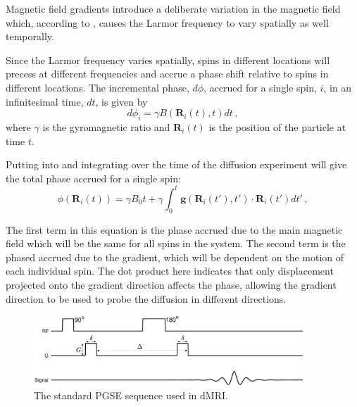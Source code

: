 Magnetic field gradients introduce a deliberate variation in the magnetic field which, according to , causes the Larmor frequency to vary spatially as well temporally.

Since the Larmor frequency varies spatially, spins in different locations will precess at different frequencies and accrue a phase shift relative to spins in different locations. 
The incremental phase, $d\phi$, accrued for a single spin, $i$, in an infinitesimal time, $dt$, %
is given by
\begin{equation}
  d\phi_i = \gamma B(\mathbf{R}_i(t), t) dt\,,
  \label{eq:dphi}
\end{equation}
where $\gamma$ is the gyromagnetic ratio and  $\mathbf{R}_i(t)$ is the position of the particle at time $t$. %

Putting  into  and integrating over the time of the diffusion experiment will give the total phase accrued for a single spin:
\begin{equation}
  \phi(\mathbf{R}_i(t)) = \gamma B_0t + \gamma\int_0^t\mathbf{g}(\mathbf{R}_i(t'), t')\cdot\mathbf{R}_i(t')dt'\,,
  \label{eq:phase_singlespin}
\end{equation}


The first term in this equation is the phase accrued due to the main magnetic field which will be the same for all spins in the system.
The second term is the phased accrued due to the gradient, which will be dependent on the motion of each individual spin.
The dot product here indicates that only displacement projected onto the gradient direction affects the phase, allowing the gradient direction to be used to probe the diffusion in different directions.

\begin{figure}
  \centering
  \includegraphics[width=0.9\textwidth]{figures/background/PGSE_diagram.eps}
  \caption{The standard \acl{PGSE} sequence used in \ac{dMRI}.}
  \label{fig:PGSE_diagram}
\end{figure}

